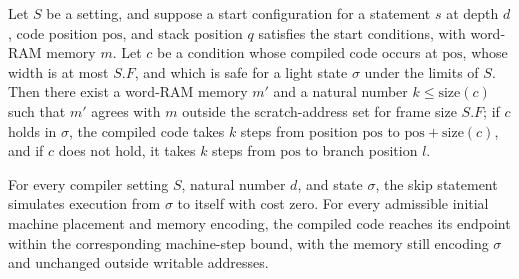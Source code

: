 \begin{theorem}
\label{Light.Compiler.Start.test}
\leanok
{}
Let $S$ be a setting, and suppose a start configuration for a statement $s$ at depth
$d$, code position $\mathrm{pos}$, and stack position $q$ satisfies the start
conditions, with word-RAM memory $m$. Let $c$ be a condition whose compiled code occurs
at $\mathrm{pos}$, whose width is at most $S.F$, and which is safe for a light state
$\sigma$ under the limits of $S$. Then there exist a word-RAM memory $m'$ and a natural
number $k\le\mathrm{size}(c)$ such that $m'$ agrees with $m$ outside the scratch-address
set for frame size $S.F$; if $c$ holds in $\sigma$, the compiled code takes $k$ steps
from position $\mathrm{pos}$ to $\mathrm{pos}+\mathrm{size}(c)$, and if $c$ does not
hold, it takes $k$ steps from $\mathrm{pos}$ to branch position $l$.
\end{theorem}

\begin{theorem}
\label{Light.Compiler.sim_skip}
\leanok
{}
For every compiler setting $S$, natural number $d$, and state $\sigma$, the skip
statement simulates execution from $\sigma$ to itself with cost zero. For every
admissible initial machine placement and memory encoding, the compiled code reaches its
endpoint within the corresponding machine-step bound, with the memory still encoding
$\sigma$ and unchanged outside writable addresses.
\end{theorem}

